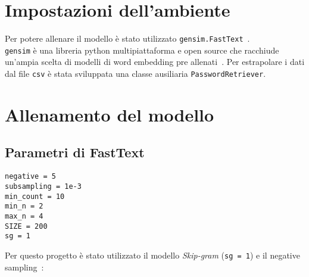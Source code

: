\section{Impostazioni dell'ambiente}
\label{sec:impostazioni ambiente}
Per potere allenare il modello è stato utilizzato \texttt{gensim.FastText}~\cite{gensim}.
\\
\texttt{gensim} è una libreria python multipiattaforma e open source che racchiude un'ampia scelta di modelli di word embedding pre allenati~\cite{gensim}.
Per estrapolare i dati dal file \texttt{csv} è stata sviluppata una classe ausiliaria \texttt{PasswordRetriever}.
\section{Allenamento del modello}
\label{sec:allenamento modello}
\subsection{Parametri di FastText}
\label{sec:parametri di fasttext}
\begin{verbatim}
negative = 5
subsampling = 1e-3
min_count = 10
min_n = 2
max_n = 4
SIZE = 200
sg = 1
\end{verbatim}
Per questo progetto è stato utilizzato il modello \emph{Skip-gram} (\texttt{sg = 1}) e il negative sampling~\cite{negative}:
